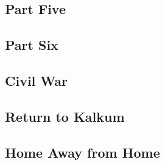 \subsection{Part Five}


\subsection{Part Six}


\subsection{Civil War}


\subsection{Return to Kalkum}


\subsection{Home Away from Home}

